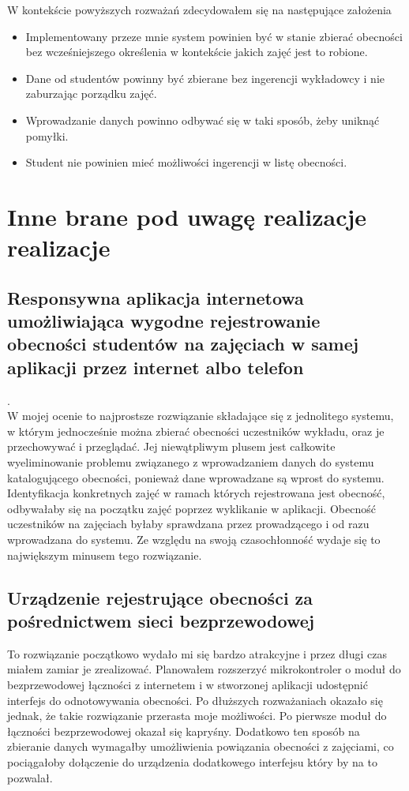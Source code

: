 \documentclass[declaration,shortabstract, mgr]{iithesis}
\begin{document}
\indent W kontekście powyższych rozważań zdecydowałem się na następujące założenia
\begin{itemize}
\item Implementowany przeze mnie system powinien być w stanie zbierać obecności bez wcześniejszego określenia w kontekście jakich zajęć jest to robione.
\item Dane od studentów powinny być zbierane bez ingerencji wykładowcy i nie zaburzając porządku zajęć.
\item Wprowadzanie danych powinno odbywać się w taki sposób, żeby uniknąć pomyłki.
\item Student nie powinien mieć możliwości ingerencji w listę obecności.
\end{itemize}

\section{Inne brane pod uwagę realizacje realizacje}
\subsection{Responsywna aplikacja internetowa umożliwiająca wygodne rejestrowanie obecności studentów na zajęciach w samej aplikacji przez internet albo telefon}. \\
W mojej ocenie to najprostsze rozwiązanie składające się z jednolitego systemu, w którym jednocześnie można zbierać obecności uczestników wykładu, oraz je przechowywać i przeglądać. Jej niewątpliwym plusem jest całkowite wyeliminowanie problemu związanego z wprowadzaniem danych do systemu katalogującego obecności, ponieważ dane wprowadzane są wprost do systemu. Identyfikacja konkretnych zajęć w ramach których rejestrowana jest obecność, odbywałaby się na początku zajęć poprzez wyklikanie w aplikacji. Obecność uczestników na zajęciach byłaby sprawdzana przez prowadzącego i od razu wprowadzana do systemu. Ze względu na swoją czasochłonność wydaje się to największym minusem tego rozwiązanie.
\subsection{Urządzenie rejestrujące obecności za pośrednictwem sieci bezprzewodowej}
To rozwiązanie początkowo wydało mi się bardzo atrakcyjne i przez długi czas miałem zamiar je zrealizować. Planowałem rozszerzyć mikrokontroler o moduł do bezprzewodowej łączności z internetem i w stworzonej aplikacji udostępnić interfejs do odnotowywania obecności. Po dłuższych rozważaniach okazało się jednak, że takie rozwiązanie przerasta moje możliwości. Po pierwsze moduł do łączności bezprzewodowej okazał się kapryśny. Dodatkowo ten sposób na zbieranie danych wymagałby umożliwienia powiązania obecności z zajęciami, co pociągałoby dołączenie do urządzenia dodatkowego interfejsu który by na to pozwalał.
\end{document}
